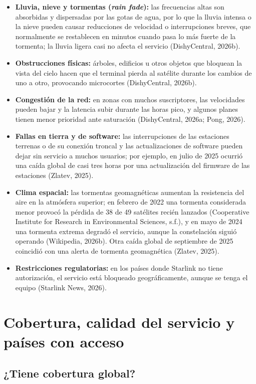\documentclass[12pt,letterpaper]{article}
\begin{document}
\begin{itemize}[nosep]
    \item \textbf{Lluvia, nieve y tormentas (\textit{rain fade}):} las frecuencias altas son absorbidas y dispersadas por las gotas de agua, por lo que la lluvia intensa o la nieve pueden causar reducciones de velocidad o interrupciones breves, que normalmente se restablecen en minutos cuando pasa lo más fuerte de la tormenta; la lluvia ligera casi no afecta el servicio (DishyCentral, 2026b).
    \item \textbf{Obstrucciones físicas:} árboles, edificios u otros objetos que bloquean la vista del cielo hacen que el terminal pierda al satélite durante los cambios de uno a otro, provocando microcortes (DishyCentral, 2026b).
    \item \textbf{Congestión de la red:} en zonas con muchos suscriptores, las velocidades pueden bajar y la latencia subir durante las horas pico, y algunos planes tienen menor prioridad ante saturación (DishyCentral, 2026a; Pong, 2026).
    \item \textbf{Fallas en tierra y de software:} las interrupciones de las estaciones terrenas o de su conexión troncal y las actualizaciones de software pueden dejar sin servicio a muchos usuarios; por ejemplo, en julio de 2025 ocurrió una caída global de casi tres horas por una actualización del firmware de las estaciones (Zlatev, 2025).
    \item \textbf{Clima espacial:} las tormentas geomagnéticas aumentan la resistencia del aire en la atmósfera superior; en febrero de 2022 una tormenta considerada menor provocó la pérdida de 38 de 49 satélites recién lanzados (Cooperative Institute for Research in Environmental Sciences, s.f.), y en mayo de 2024 una tormenta extrema degradó el servicio, aunque la constelación siguió operando (Wikipedia, 2026b). Otra caída global de septiembre de 2025 coincidió con una alerta de tormenta geomagnética (Zlatev, 2025).
    \item \textbf{Restricciones regulatorias:} en los países donde Starlink no tiene autorización, el servicio está bloqueado geográficamente, aunque se tenga el equipo (Starlink News, 2026).
\end{itemize}

\section{Cobertura, calidad del servicio y países con acceso}

\subsection{¿Tiene cobertura global?}
\end{document}
